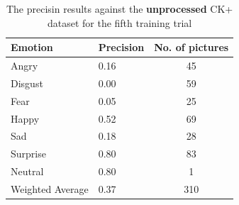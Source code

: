 \documentclass[runningheads,a4paper,11pt]{report}
\begin{document}
\begin{table}[htbp]
	\caption{The precisin results against the \textbf{unprocessed} CK+ dataset for the fifth training trial}
	\label{fer_training_28k_01_mean_square_unprocessed_ckp}
		\begin{center}
			\begin{tabular}{p{110pt}p{110pt}c}
				\textbf{Emotion}& \textbf{Precision}& \textbf{No. of pictures} \\
				\hline\hline
				Angry& 0.16& 45 \\
				Disgust& 0.00& 59 \\
				Fear& 0.05& 25 \\
				Happy& 0.52& 69 \\
				Sad& 0.18& 28 \\
				Surprise& 0.80& 83 \\
				Neutral& 0.80& 1 \\
				\hline
				Weighted Average& 0.37& 310
			\end{tabular}
		\end{center}
\end{table}
\end{document}

